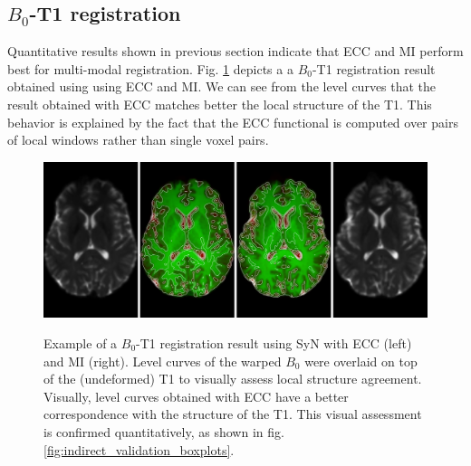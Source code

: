 \subsection{$B_{0}$-T1 registration}
Quantitative results shown in previous section indicate that ECC and MI perform best for multi-modal registration. Fig. \ref{fig:comparison_B0_T1_coregistration} depicts a a $B_{0}$-T1 registration result obtained using using ECC and MI. We can see from the level curves that the result obtained with ECC matches better the local structure of the T1. This behavior is explained by the fact that the ECC functional is computed over pairs of local windows rather than single voxel pairs.\\
\begin{figure}[p]
\centering
    \includegraphics[width=1.0\linewidth]{./images/T1B0Result/epicor_b0up_ecc_mi.png}\\
    \caption{{\small Example of a $B_{0}$-T1 registration result using SyN with ECC (left) and MI (right). Level curves of the warped $B_{0}$ were overlaid on top of the (undeformed) T1 to visually assess local structure agreement. Visually, level curves obtained with ECC have a better correspondence with the structure of the T1. This visual assessment is confirmed quantitatively, as shown in fig. \ref{fig:indirect_validation_boxplots}.}}
\label{fig:comparison_B0_T1_coregistration}
\end{figure}

